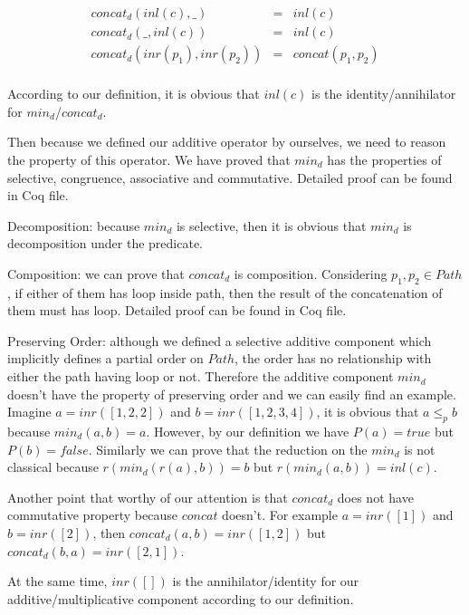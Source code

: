 \documentclass[a4paper,12pt,twoside,openright]{report}
\newcommand{\e}[2]{
\begin{equation}
  \label{#1} 
  #2
\end{equation}
}
\begin{document}
\e{pf:def:elementary_path_concat_d}{
\begin{array}{rcl}
concat_d(inl(c),\_)	 & = & inl(c) \\
concat_d(\_,inl(c))	 & = & inl(c) \\
concat_d(inr(p_1),inr(p_2))	 & = & concat(p_1,p_2)\\
\end{array}
}

According to our definition, it is obvious that $inl(c)$ is the identity/annihilator for $min_d$/$concat_d$.

Then because we defined our additive operator by ourselves, we need to reason the property of this operator. We have proved that $min_d$ has the properties of selective, congruence, associative and commutative. Detailed proof can be found in Coq file.

Decomposition: because $min_d$ is selective, then it is obvious that $min_d$ is decomposition under the predicate.

Composition: we can prove that $concat_d$ is composition. Considering $p_1,p_2 \in Path$, if either of them has loop inside path, then the result of the concatenation of them must has loop. Detailed proof can be found in Coq file.

Preserving Order: although we defined a selective additive component which implicitly defines a partial order on $Path$, the order has no relationship with either the path having loop or not. Therefore the additive component $min_d$ doesn't have the property of preserving order and we can easily find an example. Imagine $a = inr([1,2,2])$ and $b = inr([1,2,3,4])$, it is obvious that $a \leq_p b$ because $min_d(a,b) = a$. However, by our definition we have $P(a) = true$ but $P(b) = false$. Similarly we can prove that the reduction on the $min_d$ is not classical because $r(min_d(r(a),b)) = b$ but $r(min_d(a,b)) = inl(c)$.



Another point that worthy of our attention is that $concat_d$ does not have commutative property because $concat$ doesn't. For example $a = inr([1])$ and $b = inr([2])$, then $concat_d(a,b) = inr([1,2])$ but $concat_d(b,a) = inr([2,1])$.

At the same time, $inr([])$ is the annihilator/identity for our additive/multiplicative component according to our definition.
\end{document}
